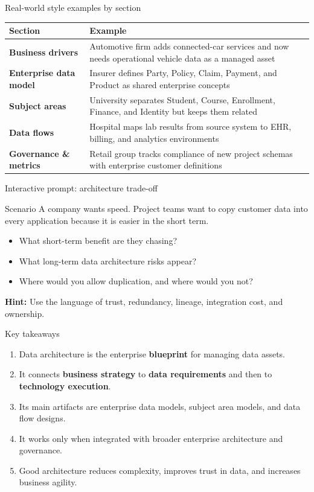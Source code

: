 \documentclass[aspectratio=169,professionalfonts]{beamer}
\newcommand{\sourcefooter}{\vspace{0.4em}{\tiny Source: DAMA-DMBOK2, Chapter 4 (Data Architecture).}}
\begin{document}
\begin{frame}{Real-world style examples by section}
\small
\begin{tabularx}{\textwidth}{>{\bfseries}p{3cm}X}
\toprule
Section & Example \\
\midrule
Business drivers & Automotive firm adds connected-car services and now needs operational vehicle data as a managed asset \\
Enterprise data model & Insurer defines Party, Policy, Claim, Payment, and Product as shared enterprise concepts \\
Subject areas & University separates Student, Course, Enrollment, Finance, and Identity but keeps them related \\
Data flows & Hospital maps lab results from source system to EHR, billing, and analytics environments \\
Governance \& metrics & Retail group tracks compliance of new project schemas with enterprise customer definitions \\
\bottomrule
\end{tabularx}
\sourcefooter
\end{frame}

\begin{frame}{Interactive prompt: architecture trade-off}
\begin{block}{Scenario}
A company wants speed. Project teams want to copy customer data into every application because it is easier in the short term.
\end{block}
\begin{itemize}
    \item What short-term benefit are they chasing?
    \item What long-term data architecture risks appear?
    \item Where would you allow duplication, and where would you not?
\end{itemize}
\vspace{0.4em}
\textbf{Hint:} Use the language of trust, redundancy, lineage, integration cost, and ownership.
\end{frame}

\begin{frame}{Key takeaways}
\begin{enumerate}
    \item Data architecture is the enterprise \textbf{blueprint} for managing data assets.
    \item It connects \textbf{business strategy} to \textbf{data requirements} and then to \textbf{technology execution}.
    \item Its main artifacts are enterprise data models, subject area models, and data flow designs.
    \item It works only when integrated with broader enterprise architecture and governance.
    \item Good architecture reduces complexity, improves trust in data, and increases business agility.
\end{enumerate}
\sourcefooter
\end{frame}
\end{document}
